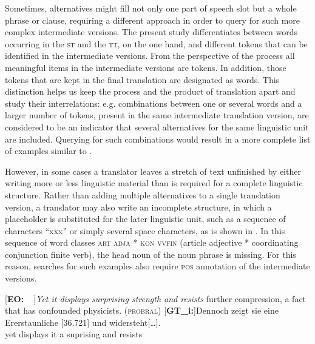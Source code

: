 \documentclass[output=paper]{LSP/langsci}
\begin{document}
Sometimes, alternatives might fill not only one part of speech slot but a whole phrase or clause, requiring a different approach in order to query for such more complex intermediate versions. The present study differentiates between words occurring in the \textsc{st} and the \textsc{tt}, on the one hand, and different tokens that can be identified in the intermediate versions. From the perspective of the process all meaningful items in the intermediate versions are tokens. In addition, those tokens that are kept in the final translation are designated as words. This distinction helps us keep the process and the product of translation apart and study their interrelations: e.g. combinations between one or several words and a larger number of tokens, present in the same intermediate translation version, are considered to be an indicator that several alternatives for the same linguistic unit are included. Querying for such combinations would result in a more complete list of examples similar to .
 
However, in some cases a translator leaves a stretch of text unfinished by either writing more or less linguistic material than is required for a complete linguistic structure. Rather than adding multiple alternatives to a single translation version, a translator may also write an incomplete structure, in which a placeholder is substituted for the later linguistic unit, such as a sequence of characters “xxx” or simply several space characters, as is shown in . In this sequence of word classes \textsc{art} \textsc{adja} * \textsc{kon} \textsc{vvfin} (article adjective * coordinating conjunction finite verb), the head noun of the noun phrase is missing. For this reason, searches for such examples also require \textsc{pos} annotation of the intermediate versions.



\ea \label{ex:1:5}
\begin{xlist}
\exi{}[\textbf{EO:~~}]{\emph{Yet it displays surprising strength and resists} further compression, a fact that has confounded physicists. (\textsc{probral})}
\exi{}[\textbf{GT\_i:}]{\gll  Denno\stern{}ch\raute\stern\stern\stern\stern\stern{} zeigt\stern\raute{} sie\raute{} eine\raute{} Er\pfeil\pfeil\pfeil\raute{}erstaun\stern\stern{}liche\raute{} [\stern{}36.721] \raute\raute\stern{} und\raute\stern\stern\stern\stern\stern\stern{} widersteht[{\dots}].\\
 yet displays it a suprising\raute{}\raute{}\raute{} {} \raute{}\raute{} and resists \\
}
\end{xlist}
\z
\end{document}
